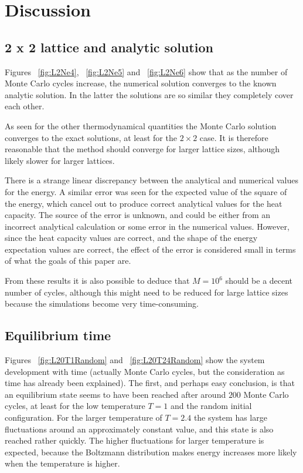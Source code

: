 \documentclass[aps,reprint]{revtex4-1}
\begin{document}
\section{Discussion} \label{sec:discussion}
\subsection{2 x 2 lattice and analytic solution}
Figures ~\ref{fig:L2Ne4}, ~\ref{fig:L2Ne5} and ~\ref{fig:L2Ne6} show that as
the number of Monte Carlo cycles increase, the numerical solution converges to
the known analytic solution. In the latter the solutions are so similar they
completely cover each other.

As seen for the other thermodynamical quantities the Monte Carlo solution converges
to the exact solutions, at least for the $2 \times 2$ case. It is therefore reasonable
that the method should converge for larger lattice sizes, although likely slower for
larger lattices.

There is a strange linear discrepancy between the analytical and numerical
values for the energy. A similar error was seen for the expected value of the
square of the energy, which cancel out to produce correct analytical values
for the heat capacity. The source of the error is unknown, and could be either
from an incorrect analytical calculation or some error in the numerical values.
However, since the heat capacity values are correct, and the shape of the energy
expectation values are correct, the effect of the error is considered small
in terms of what the goals of this paper are.

From these results it is also possible to deduce that $M = 10^6$ should be a
decent number of cycles, although this might need to be reduced for large lattice
sizes because the simulations become very time-consuming.
\subsection{Equilibrium time}
Figures ~\ref{fig:L20T1Random} and ~\ref{fig:L20T24Random} show the system development
with time (actually Monte Carlo cycles, but the consideration as time has already been
explained). The first, and perhaps easy conclusion, is that an equilibrium state
seems to have been reached after around $200$ Monte Carlo cycles, at least for the
low temperature $T = 1$ and the random initial configuration. For the larger temperature of $T = 2.4$ the system has
large fluctuations around an approximately constant value, and this state is also
reached rather quickly. The higher fluctuations for larger temperature is expected,
because the Boltzmann distribution makes energy increases more likely when the temperature
is higher.
\end{document}
